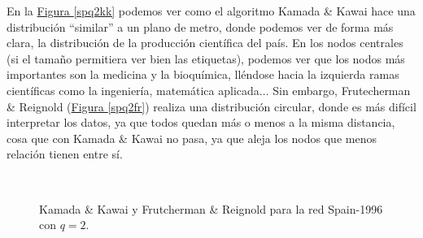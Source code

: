 \documentclass[paper=a4, fontsize=11pt]{article} %
\numberwithin{equation}{section} %
\numberwithin{figure}{section} %
\numberwithin{table}{section} %
\begin{document}
En la \hyperref[spq2kk]{Figura \ref*{spq2kk}} podemos ver como el algoritmo Kamada \& Kawai hace una distribución ``similar'' a un plano de metro, donde podemos ver de forma más clara, la distribución de la producción científica del país. En los nodos centrales (si el tamaño permitiera ver bien las etiquetas), podemos ver que los nodos más importantes son la medicina y la bioquímica, lléndose hacia la izquierda ramas científicas como la ingeniería, matemática aplicada$\ldots$ Sin embargo, Frutecherman \& Reignold (\hyperref[spq2fr]{Figura \ref*{spq2fr}}) realiza una distribución circular, donde es más difícil interpretar los datos, ya que todos quedan más o menos a la misma distancia, cosa que con Kamada \& Kawai no pasa, ya que aleja los nodos que menos relación tienen entre sí.

\begin{figure}[H]
    \centering
    \mbox {
      \qquad
    }
    \caption{Kamada \& Kawai y Frutcherman \& Reignold para la red Spain-1996 con $q=2$.}
    \label{spq2}
\end{figure}
\end{document}
